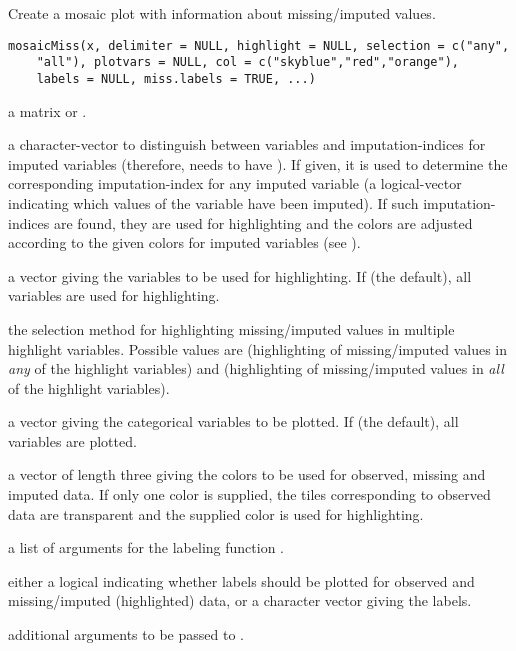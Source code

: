 %
\begin{Description}\relax
Create a mosaic plot with information about missing/imputed values.
\end{Description}
%
\begin{Usage}
\begin{verbatim}
mosaicMiss(x, delimiter = NULL, highlight = NULL, selection = c("any",
    "all"), plotvars = NULL, col = c("skyblue","red","orange"),
    labels = NULL, miss.labels = TRUE, ...)
\end{verbatim}
\end{Usage}
%
\begin{Arguments}
\begin{ldescription}
\item[\code{x}] a matrix or .
\item[\code{delimiter}] a character-vector to distinguish between variables
and imputation-indices for imputed variables (therefore,  needs
to have ). If given, it is used to determine the corresponding
imputation-index for any imputed variable (a logical-vector indicating
which values of the variable have been imputed). If such imputation-indices
are found, they are used for highlighting and the colors are adjusted 
according to the given colors for imputed variables (see ).
\item[\code{highlight}] a vector giving the variables to be used for highlighting.  
If  (the default), all variables are used for highlighting.
\item[\code{selection}] the selection method for highlighting missing/imputed values in 
multiple highlight variables.  Possible values are  
(highlighting of missing/imputed values in \emph{any} of the highlight variables) 
and  (highlighting of missing/imputed values in \emph{all} of the 
highlight variables).
\item[\code{plotvars}] a vector giving the categorical variables to be plotted.  If 
 (the default), all variables are plotted.
\item[\code{col}] a vector of length three giving the colors to be used for observed, 
missing and imputed data. If only one color is supplied, the tiles corresponding 
to observed data are transparent and the supplied color is used for 
highlighting.
\item[\code{labels}] a list of arguments for the labeling function 
.
\item[\code{miss.labels}] either a logical indicating whether labels should be 
plotted for observed and missing/imputed (highlighted) data, or a character vector 
giving the labels.
\item[\code{...}] additional arguments to be passed to .
\end{ldescription}
\end{Arguments}
